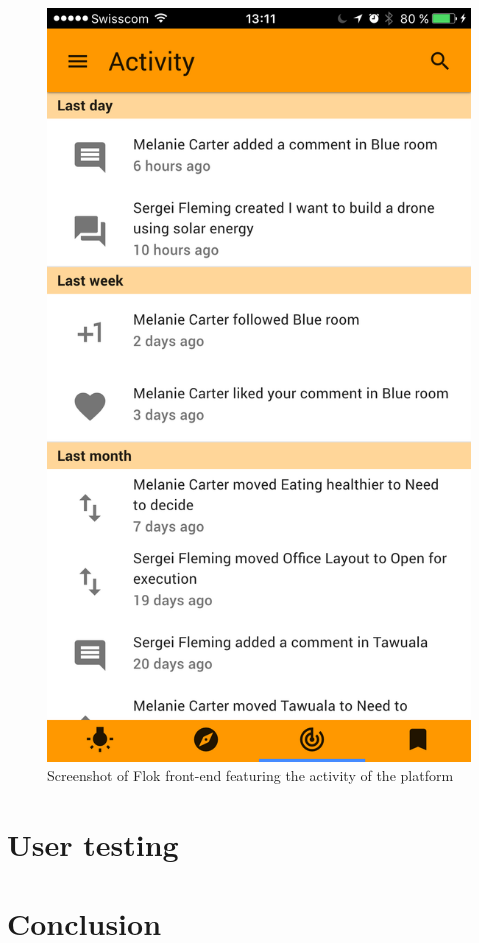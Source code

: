 \documentclass[a4paper,12pt, oneside]{article}
\begin{document}
\begin{figure}[!htb]
    \centering
    \includegraphics[width=.32\textwidth]{images/activity.png}
    \caption{Screenshot of Flok front-end featuring the activity of the platform}
    \label{fig.activity}
\end{figure}

\section{User testing}

\section{Conclusion}

\clearpage


\end{document}
